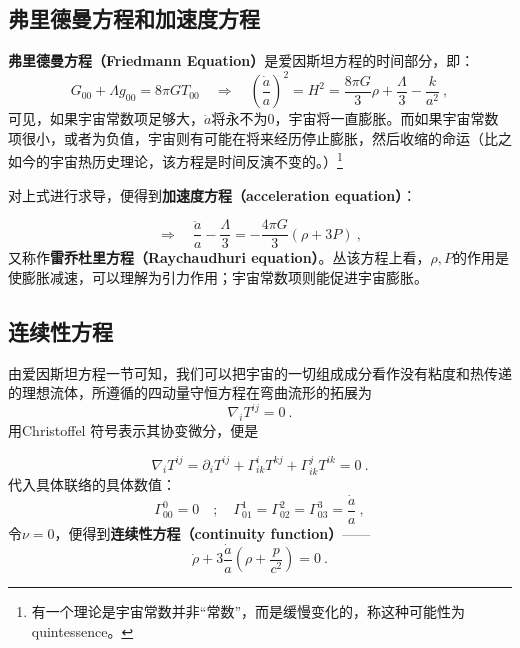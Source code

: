 
\subsection{弗里德曼方程和加速度方程}
\textbf{弗里德曼方程（Friedmann Equation）}是爱因斯坦方程的时间部分，即：
\begin{equation}G_{00}+\Lambda g_{00}=8\pi GT_{00}\quad\Rightarrow\quad\left(\frac{\dot{a}}{a}\right)^2=H^2=\frac{8\pi G}{3}\rho+\frac{\Lambda}{3}-\frac{k}{a^2}~,\end{equation}
可见，如果宇宙常数项足够大，$\dot a$将永不为0，宇宙将一直膨胀。而如果宇宙常数项很小，或者为负值，宇宙则有可能在将来经历停止膨胀，然后收缩的命运（比之如今的宇宙热历史理论，该方程是时间反演不变的。）\footnote{有一个理论是宇宙常数并非“常数”，而是缓慢变化的，称这种可能性为quintessence。}

对上式进行求导，便得到\textbf{加速度方程（acceleration equation）}：

\begin{equation}
\Rightarrow\quad\frac{\ddot{a}}{a}-\frac{\Lambda}{3}=-\frac{4\pi G}{3}(\rho+3P)~,
\end{equation}
又称作\textbf{雷乔杜里方程（Raychaudhuri equation）}。丛该方程上看，$\rho,P$的作用是使膨胀减速，可以理解为引力作用；宇宙常数项则能促进宇宙膨胀。

\subsection{连续性方程}
由爱因斯坦方程一节可知，我们可以把宇宙的一切组成成分看作没有粘度和热传递的理想流体，所遵循的四动量守恒方程在弯曲流形的拓展为
\begin{equation}
\nabla_{i}T^{ij}=0~.
\end{equation}
用Christoffel 符号表示其协变微分，便是

\begin{equation}\nabla_iT^{ij}=\partial_iT^{ij}+\Gamma_{ik}^iT^{kj}+\Gamma_{ik}^jT^{ik}=0~.
\end{equation}
代入具体联络的具体数值：
\begin{equation}\Gamma_{00}^0=0\quad;\quad\Gamma_{01}^1=\Gamma_{02}^2=\Gamma_{03}^3=\frac{\dot{a}}{a}~,\end{equation}
令$\nu=0$，便得到\textbf{连续性方程（continuity function）}——
\begin{equation}\label{eq_Frieq_1}
\dot{\rho}+3\frac{\dot{a}}{a}\left(\rho+\frac{p}{c^2}\right)=0~.
\end{equation}
